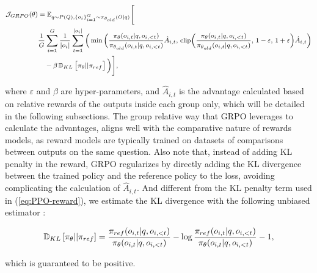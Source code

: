 \begin{itemize}[topsep=0pt]
\begin{itemize}[topsep=0pt]
\begin{equation}
\footnotesize
\begin{split}
    \mathcal{J}_{GRPO}(\theta) &= \mathbb{E}_{q \sim P(Q), \{o_i\}_{i=1}^G \sim \pi_{\theta_{old}}(O|q)} \Bigg[ \\
    & \frac{1}{G}\sum_{i=1}^G \frac{1}{|o_i|} \sum_{t=1}^{|o_i|} \bigg( \min \Big( \frac{\pi_\theta(o_{i,t} | q, o_{i,<t})}{\pi_{\theta_{old}}(o_{i,t} | q, o_{i,<t})} \hat{A}_{i,t},\, \text{clip}\Big( \frac{\pi_\theta(o_{i,t} | q, o_{i,<t})}{\pi_{\theta_{old}}(o_{i,t} | q, o_{i,<t})},\, 1 - \varepsilon,\, 1 + \varepsilon \Big) \hat{A}_{i,t} \Big) \\
    & \quad - \beta\, \mathbb{D}_{KL}\left[\pi_{\theta} || \pi_{ref}\right]\bigg)\Bigg],
\end{split}
\label{eq:GRPO-obj}
\end{equation}

where $\varepsilon$ and $\beta$ are hyper-parameters, and $\hat{A}_{i,t}$  is the advantage calculated based on relative rewards of the outputs inside each group only, which will be detailed in the following subsections. The group relative way that GRPO leverages to calculate the advantages, aligns well with the comparative nature of rewards models,  as reward models are typically trained on datasets of comparisons between outputs on the same question. Also note that, instead of adding KL penalty in the reward, GRPO regularizes by directly adding the KL divergence between the trained policy and the reference policy to the loss, avoiding complicating the calculation of  $\hat{A}_{i,t}$. And different from the KL penalty term used in (\ref{eq:PPO-reward}), we estimate the KL divergence with the following unbiased estimator \citep{kl_approx}:

\begin{equation}
\small
    \mathbb{D}_{KL}\left[\pi_{\theta} || \pi_{ref}\right] = \frac{\pi_{ref}(o_{i,t}|q,o_{i,<t})}{\pi_{\theta}(o_{i,t}|q,o_{i,<t})}- \log\frac{\pi_{ref}(o_{i,t}|q,o_{i,<t})}{\pi_{\theta}(o_{i,t}|q,o_{i,<t})} - 1,
\end{equation}

which is guaranteed to be positive.


\end{itemize}
\end{itemize}
